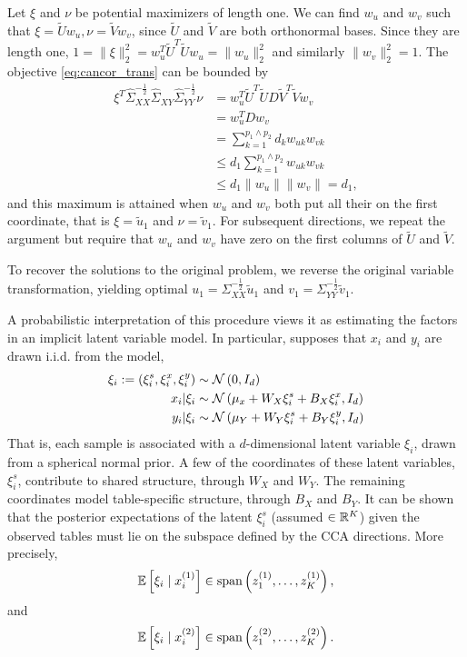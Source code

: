 \documentclass[14pt]{extarticle}
\begin{document}
Let $\xi$ and $\nu$ be potential maximizers of length one. We can find $w_{u}$
and $w_{v}$ such that $\xi = \tilde{U}w_{u}, \nu = \tilde{V}w_{v}$, since
$\tilde{U}$ and $\tilde{V}$ are both orthonormal bases. Since they are length
one, $1 = \|\xi\|^{2}_{2} = w_{u}^{T}\tilde{U}^{T}\tilde{U}w_{u} =
\|w_{u}\|_{2}^{2}$ and similarly $\|w_{v}\|_{2}^{2} = 1$. The objective
\ref{eq:cancor_trans} can be bounded by
\begin{align*}
\xi^{T}\hat{\Sigma}_{XX}^{-\frac{1}{2}}\hat{\Sigma}_{XY}\hat{\Sigma}_{YY}^{-\frac{1}{2}}\nu
&= w_{u}^{T}\tilde{U}^{T}\tilde{U}D\tilde{V}^{T}\tilde{V}w_{v} \\
&= w_{u}^{T}Dw_{v} \\
&= \sum_{k = 1}^{p_{1} \wedge p_{2}} d_{k}w_{uk}w_{vk} \\
&\leq d_{1} \sum_{k = 1}^{p_{1} \wedge p_{2}} w_{uk}w_{vk} \\
&\leq d_{1} \|w_{u}\|\|w_{v}\| = d_{1},
\end{align*}
and this maximum is attained when $w_{u}$ and $w_{v}$ both put all their
on the first coordinate, that is $\xi = \tilde{u}_{1}$ and $\nu =
\tilde{v}_{1}$. For subsequent directions, we repeat the argument but require
that $w_{u}$ and $w_{v}$ have zero  on the first columns of $\tilde{U}$
and $\tilde{V}$.

To recover the solutions to the original problem, we reverse the original
variable transformation, yielding optimal $u_{1} =
\Sigma_{XX}^{-\frac{1}{2}}\tilde{u}_{1}$ and $v_{1} =
\Sigma_{YY}^{-\frac{1}{2}}\tilde{v}_{1}$.

A probabilistic interpretation of this procedure views it as estimating the
factors in an implicit latent variable model. In particular,
\citep{bach2005probabilistic} supposes that $x_{i}$ and $y_{i}$ are drawn i.i.d.
from the model,
\begin{align*}
  \xi_{i} := \left(\xi_{i}^{s}, \xi_{i}^{x}, \xi_{i}^{y}\right) &\sim
  \mathcal{N}\left(0, I_{d}\right) \\
  x_{i} \vert \xi_{i} &\sim \mathcal{N}\left(\mu_{x} + W_{X}\xi_{i}^{s} + B_{X}\xi_{i}^{x}, I_{d} \right) \\
  y_{i} \vert \xi_{i} &\sim \mathcal{N}\left(\mu_{Y} + W_{Y}\xi_{i}^{s} + B_{Y}\xi_{i}^{y}, I_{d}\right)
\end{align*}
That is, each sample is associated with a $d$-dimensional latent variable
$\xi_{i}$, drawn from a spherical normal prior. A few of the coordinates of
these latent variables, $\xi_{i}^{s}$, contribute to shared structure, through
$W_{X}$ and $W_{Y}$. The remaining coordinates model table-specific structure,
through $B_{X}$ and $B_{Y}$. It can be shown that the posterior expectations of
the latent $\xi_{i}^{s}$ (assumed $\in \mathbb{R}^{K}$) given the observed tables
must lie on the subspace defined by the CCA directions. More precisely,
\begin{align*}
  \mathbb{E}\left[{\xi_{i} \mid x_{i}^{(1)}}\right] \in \text{span}\left(z_{1}^{(1)},
    \dots, z_{K}^{(1)}\right),
\end{align*}
and
\begin{align*}
  \mathbb{E}\left[{\xi_{i} \mid x_{i}^{(2)}}\right] \in \text{span}\left(z_{1}^{(2)},
    \dots, z_{K}^{(2)}\right).
\end{align*}
\end{document}
